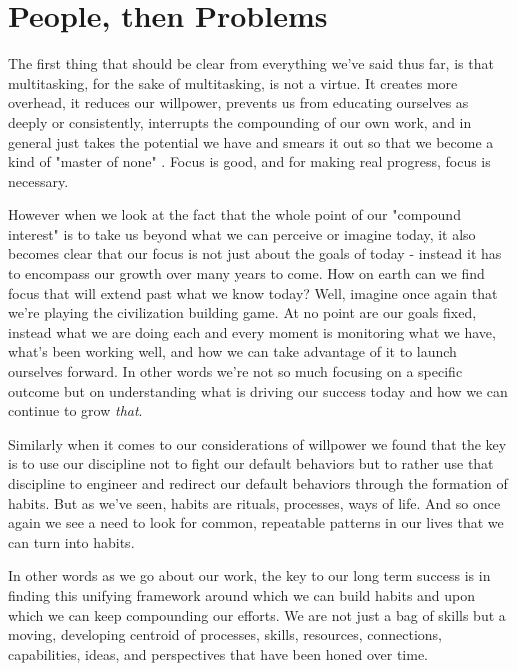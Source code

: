\documentclass[11pt]{book}
\begin{document}
\section{People, then Problems}
The first thing that should be clear from everything we've said thus far, is that multitasking, for the sake of multitasking, is not a virtue. It creates more overhead, it reduces our willpower, prevents us from educating ourselves as deeply or consistently, interrupts the compounding of our own work, and in general just takes the potential we have and smears it out so that we become a kind of "master of none" \cite{keller}. Focus is good, and for making real progress, focus is necessary. 
\newline

However when we look at the fact that the whole point of our "compound interest" is to take us beyond what we can perceive or imagine today, it also becomes clear that our focus is not just about the goals of today - instead it has to encompass our growth over many years to come. How on earth can we find focus that will extend past what we know today? Well, imagine once again that we're playing the civilization building game. At no point are our goals fixed, instead what we are doing each and every moment is monitoring what we have, what's been working well, and how we can take advantage of it to launch ourselves forward. In other words we're not so much focusing on a specific outcome but on understanding what is driving our success today and how we can continue to grow \textit{that}. 
\newline

Similarly when it comes to our considerations of willpower we found that the key is to use our discipline not to fight our default behaviors but to rather use that discipline to engineer and redirect our default behaviors through the formation of habits. But as we've seen, habits are rituals, processes, ways of life. And so once again we see a need to look for common, repeatable patterns in our lives that we can turn into habits. 
\newline

In other words as we go about our work, the key to our long term success is in finding this unifying framework around which we can build habits and upon which we can keep compounding our efforts. We are not just a bag of skills but a moving, developing centroid of processes, skills, resources, connections, capabilities, ideas, and perspectives that have been honed over time.
\newline
\end{document}
